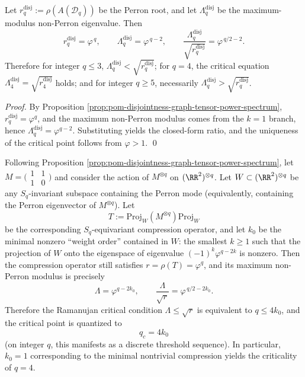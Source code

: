 \begin{corollary}[\texorpdfstring{$q=4$}{q=4} as the unique integer critical point of the Ramanujan ratio at the disjoint graph level]\label{cor:pom-disjointness-ramanujan-q4-critical}
Let \(r_q^{\mathrm{disj}}:=\rho(A(\mathcal{D}_q))\) be the Perron root, and let \(\Lambda_q^{\mathrm{disj}}\) be the maximum-modulus non-Perron eigenvalue.
Then
\[
r_q^{\mathrm{disj}}=\varphi^{\,q},\qquad \Lambda_q^{\mathrm{disj}}=\varphi^{\,q-2},\qquad
\frac{\Lambda_q^{\mathrm{disj}}}{\sqrt{r_q^{\mathrm{disj}}}}=\varphi^{\,q/2-2}.
\]
Therefore for integer \(q\le 3\), \(\Lambda_q^{\mathrm{disj}}<\sqrt{r_q^{\mathrm{disj}}}\); for \(q=4\), the critical equation \(\Lambda_4^{\mathrm{disj}}=\sqrt{r_4^{\mathrm{disj}}}\) holds; and for integer \(q\ge 5\), necessarily \(\Lambda_q^{\mathrm{disj}}>\sqrt{r_q^{\mathrm{disj}}}\).
\end{corollary}
\begin{proof}
By Proposition \ref{prop:pom-disjointness-graph-tensor-power-spectrum}, \(r_q^{\mathrm{disj}}=\varphi^q\), and the maximum non-Perron modulus comes from the \(k=1\) branch, hence \(\Lambda_q^{\mathrm{disj}}=\varphi^{q-2}\).
Substituting yields the closed-form ratio, and the uniqueness of the critical point follows from \(\varphi>1\). \qed
\end{proof}

\begin{conclusion}\label{con:pom-disjointness-sq-equivariant-critical-quantization}
Following Proposition \ref{prop:pom-disjointness-graph-tensor-power-spectrum}, let
\(
M=\bigl(\begin{smallmatrix}1&1\\[2pt]1&0\end{smallmatrix}\bigr)
\)
and consider the action of \(M^{\otimes q}\) on \((\RR^2)^{\otimes q}\).
Let \(W\subset(\RR^2)^{\otimes q}\) be any \(S_q\)-invariant subspace containing the Perron mode (equivalently, containing the Perron eigenvector of \(M^{\otimes q}\)).
Let
\[
T:=\mathrm{Proj}_W(M^{\otimes q})\mathrm{Proj}_W
\]
be the corresponding \(S_q\)-equivariant compression operator, and let \(k_0\) be the minimal nonzero ``weight order'' contained in \(W\): the smallest \(k\ge 1\) such that the projection of \(W\) onto the eigenspace of eigenvalue \((-1)^k\varphi^{q-2k}\) is nonzero.
Then the compression operator still satisfies \(r=\rho(T)=\varphi^q\), and its maximum non-Perron modulus is precisely
\[
\Lambda=\varphi^{q-2k_0},
\qquad
\frac{\Lambda}{\sqrt r}=\varphi^{\,q/2-2k_0}.
\]
Therefore the Ramanujan critical condition \(\Lambda\le \sqrt r\) is equivalent to \(q\le 4k_0\), and the critical point is quantized to
\[
\boxed{\;q_c=4k_0\;}
\]
(on integer \(q\), this manifests as a discrete threshold sequence).
In particular, \(k_0=1\) corresponding to the minimal nontrivial compression yields the criticality of \(q=4\).
\end{conclusion}

